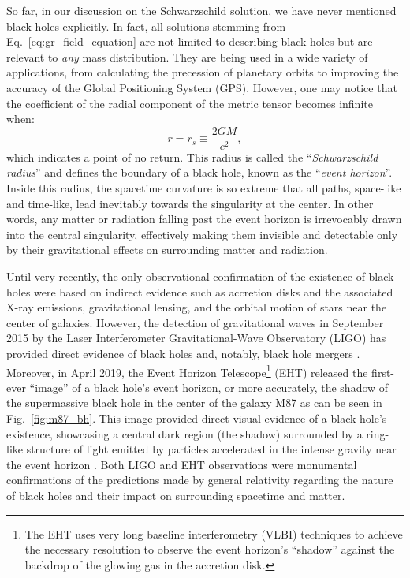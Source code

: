 \documentclass[main.tex]{subfiles}
\begin{document}
    So far, in our discussion on the Schwarzschild solution, we have never mentioned black holes explicitly. In fact, all solutions stemming from Eq.~\eqref{eq:gr_field_equation} are not limited to describing black holes but are relevant to \textit{any} mass distribution. They are being used in a wide variety of applications, from calculating the precession of planetary orbits to improving the accuracy of the Global Positioning System (GPS). However, one may notice that the coefficient of the radial component of the metric tensor becomes infinite when:
    \begin{equation}\label{eq:schwarzschild_radius}
        r = r_s \equiv \frac{2GM}{c^2},
    \end{equation}
    which indicates a point of no return. This radius is called the ``\textit{Schwarzschild radius}'' and defines the boundary of a black hole, known as the ``\textit{event horizon}''. Inside this radius, the spacetime curvature is so extreme that all paths, space-like and time-like, lead inevitably towards the singularity at the center. In other words, any matter or radiation falling past the event horizon is irrevocably drawn into the central singularity, effectively making them invisible and detectable only by their gravitational effects on surrounding matter and radiation.

    Until very recently, the only observational confirmation of the existence of black holes were based on indirect evidence such as accretion disks and the associated X-ray emissions, gravitational lensing, and the orbital motion of stars near the center of galaxies. However, the detection of gravitational waves in September 2015 by the Laser Interferometer Gravitational-Wave Observatory (LIGO) has provided direct evidence of black holes and, notably, black hole mergers \citep{LIGO:BHmerger}. Moreover, in April 2019, the Event Horizon Telescope\footnote{The EHT uses very long baseline interferometry (VLBI) techniques to achieve the necessary resolution to observe the event horizon's ``shadow'' against the backdrop of the glowing gas in the accretion disk.} (EHT) released the first-ever ``image'' of a black hole's event horizon, or more accurately, the shadow of the supermassive black hole in the center of the galaxy M87 as can be seen in Fig.~\ref{fig:m87_bh}. This image provided direct visual evidence of a black hole's existence, showcasing a central dark region (the shadow) surrounded by a ring-like structure of light emitted by particles accelerated in the intense gravity near the event horizon \citep{EHT:M87}. Both LIGO and EHT observations were monumental confirmations of the predictions made by general relativity regarding the nature of black holes and their impact on surrounding spacetime and matter.
\end{document}
